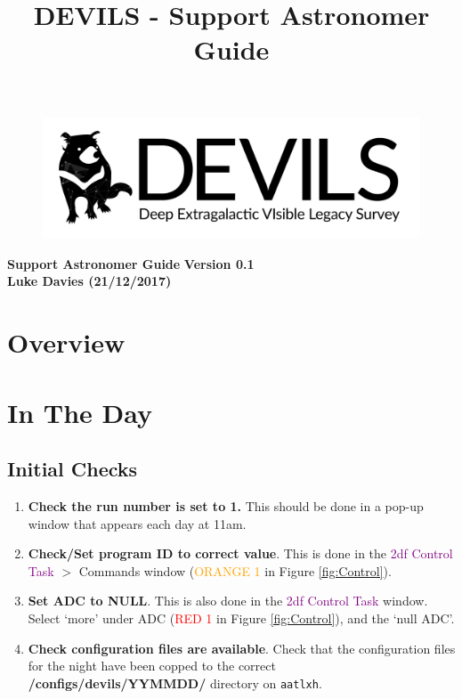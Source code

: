 \documentclass[12pt]{article}
\begin{document}
\title{DEVILS - Support Astronomer Guide}
\begin{center}

\begin{figure}
\begin{center}
\includegraphics[scale=0.8]{devils-logo_big.png}
\end{center}
\end{figure}

\Huge {\textcolor{PineGreen}{\textbf{Support Astronomer Guide}}}
\Huge {\textcolor{PineGreen}{\textbf{ Version 0.1}}}\\
\Large \textbf{Luke Davies (21/12/2017)}\\
\end{center}
\normalsize

\section{Overview}

\section{In The Day}

\subsection{Initial Checks}

\begin{enumerate}

\item \textbf{Check the run number is set to 1.} This should be done in a pop-up window that appears each day at 11am.

\item \textbf{Check/Set program ID to correct value}. This is done in the \textsf{{\textcolor{purple}{2df Control Task}}} $>$ Commands window ({\textcolor{orange}{ORANGE 1}}  in Figure \ref{fig:Control}).  

\item \textbf{Set ADC to NULL}. This is also done in the \textsf{{\textcolor{purple}{2df Control Task}}} window. Select `more' under ADC ({\textcolor{red}{RED 1}} in Figure \ref{fig:Control}), and the `null ADC'.

\item \textbf{Check configuration files are available}. Check that the configuration files for the night have been copped to the correct \textbf{/configs/devils/YYMMDD/} directory on \texttt{aatlxh}.

\end{enumerate}
\end{document}
